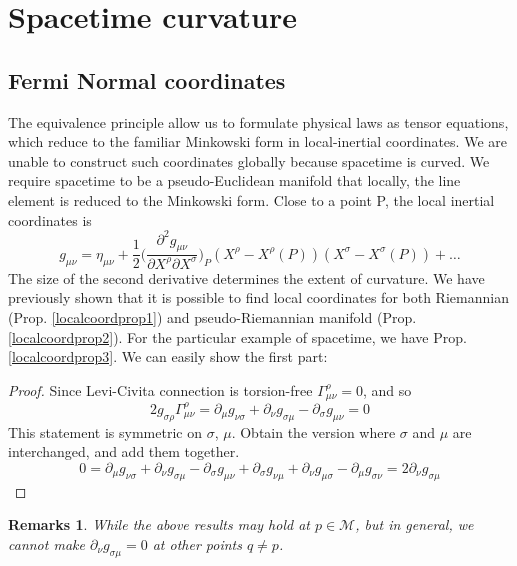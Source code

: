 \documentclass[a4paper]{article}
\newtheorem{remarks}{Remarks}[section]
\theoremstyle{new}
\begin{document}
\section{Spacetime curvature}
\subsection{Fermi Normal coordinates}
The equivalence principle allow us to formulate physical laws as tensor equations, which reduce to the familiar Minkowski form in local-inertial coordinates. We are unable to construct such coordinates globally because spacetime is curved. We require spacetime to be a pseudo-Euclidean manifold that locally, the line element is reduced to the Minkowski form. Close to a point P, the local inertial coordinates is
$$g_{\mu\nu}=\eta_{\mu\nu}+\frac{1}{2}\bigg(\frac{\partial^2g_{\mu\nu}}{\partial X^\rho\partial X^\sigma}\bigg)_P(X^\rho-X^\rho(P))(X^\sigma-X^\sigma(P))+\dots$$
The size of the second derivative determines the extent of curvature. We have previously shown that it is possible to find local coordinates for both Riemannian (Prop. \ref{localcoordprop1}) and pseudo-Riemannian manifold (Prop. \ref{localcoordprop2}). For the particular example of spacetime, we have Prop. \ref{localcoordprop3}. We can easily show the first part:
\begin{proof}
Since Levi-Civita connection is torsion-free $\Gamma_{\mu\nu}^\rho=0$, and so
$$2g_{\sigma\rho}\Gamma_{\mu\nu}^\rho=\partial_\mu g_{\nu\sigma}+\partial_\nu g_{\sigma\mu}-\partial_\sigma g_{\mu\nu}=0$$
This statement is symmetric on $\sigma$, $\mu$. Obtain the version where $\sigma$ and $\mu$ are interchanged, and add them together.
$$0=\partial_\mu g_{\nu\sigma}+\partial_\nu g_{\sigma\mu}-\partial_\sigma g_{\mu\nu}+\partial_\sigma g_{\nu\mu}+\partial_\nu g_{\mu\sigma}-\partial_\mu g_{\sigma\nu}=2\partial_\nu g_{\sigma\mu}$$
\end{proof}
\begin{remarks}
While the above results may hold at $p\in\mathcal{M}$, but in general, we cannot make $\partial_\nu g_{\sigma\mu}=0$ at other points $q\neq p$.
\end{remarks}
\end{document}
